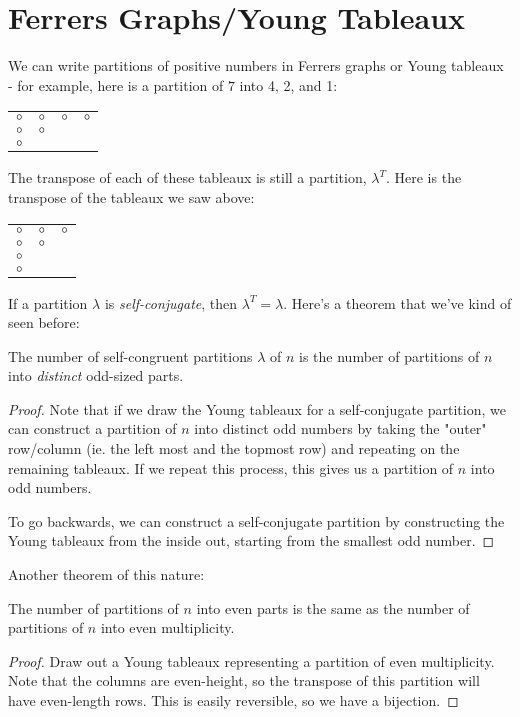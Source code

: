 \documentclass[11pt,twosided]{article}
\begin{document}
\section{Ferrers Graphs/Young Tableaux}
We can write partitions of positive numbers in Ferrers graphs or Young tableaux - for example, here is a partition of $7$ into 4, 2, and 1:
\begin{center}
\begin{tabular}{c c c c}
$\circ$ & $\circ$ & $\circ$ & $\circ$ \\
$\circ$ & $\circ$ &  &  \\
$\circ$ &  & & \\

\end{tabular}
\end{center}

The transpose of each of these tableaux is still a partition, $\lambda^T$. Here is the transpose of the tableaux we saw above: 
\begin{center}
\begin{tabular}{c c c}
$\circ$ & $\circ$ & $\circ$ \\
$\circ$ & $\circ$ & \\
$\circ$ &  &\\
$\circ$ &  &  \\
\end{tabular}
\end{center}

If a partition $\lambda$ is \textit{self-conjugate}, then $\lambda^T = \lambda$. Here's a theorem that we've kind of seen before: 
\begin{theorem}
The number of self-congruent partitions $\lambda$ of $n$ is the number of partitions of $n$ into \textit{distinct} odd-sized parts.
\end{theorem} 
\begin{proof}
Note that if we draw the Young tableaux for a self-conjugate partition, we can construct a partition of $n$ into distinct odd numbers by taking the "outer" row/column (ie. the left most and the topmost row) and repeating on the remaining tableaux. If we repeat this process, this gives us a partition of $n$ into odd numbers. 

To go backwards, we can construct a self-conjugate partition by constructing the Young tableaux from the inside out, starting from the smallest odd number. 

\end{proof}

Another theorem of this nature: 
\begin{theorem}
The number of partitions of $n$ into even parts is the same as the number of partitions of $n$ into even multiplicity. 
\end{theorem}
\begin{proof}
Draw out a Young tableaux representing a partition of even multiplicity. Note that the columns are even-height, so the transpose of this partition will have even-length rows.  This is easily reversible, so we have a bijection. 

\end{proof}
\end{document}

